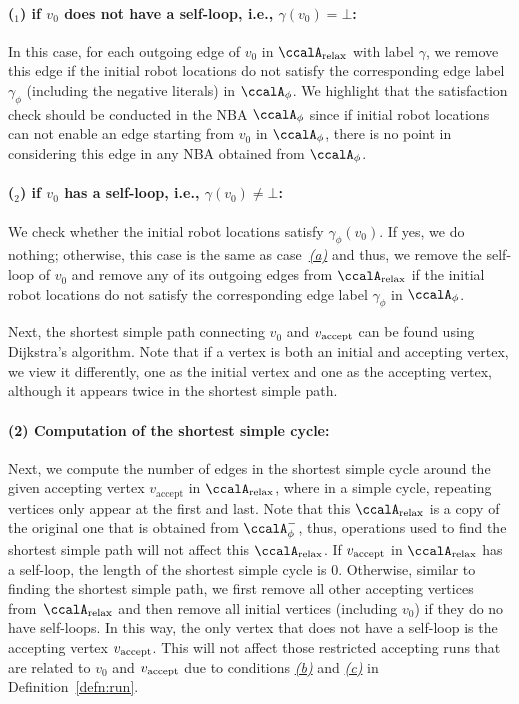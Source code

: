 \documentclass[Afour,sageh,times]{sagej}
\newcounter{mycounter}
\newcommand{\auto}[1]{\ccalA_{\textup{#1}}}
\newcommand{\autop}{\ccalA_{\phi}}
\newcommand{\vertex}[1]{v_{\textup{#1}}}
\begin{document}
{  \paragraph{($_1$) if $v_0$ does not have a self-loop, i.e., $\gamma(v_0)=\bot$:}\label{sec:initial} In this case, for each outgoing edge of $v_0$ in $\auto{relax}$ with label $\gamma$,  we remove this edge  if the initial robot locations do not satisfy the corresponding edge label $\gamma_{\phi}$ (including the negative literals) in $\autop$. We highlight that the satisfaction check should be conducted in the NBA $\autop$ since if initial robot locations can not enable an edge starting from $v_0$ in $\autop$, there is no point in considering this edge in any NBA obtained from $\autop$.
\paragraph{($_2$) if $v_0$ has a self-loop, i.e., $\gamma(v_0)\neq\bot$:} We check whether the initial robot locations satisfy $\gamma_{\phi}(v_0)$. If yes, we do nothing; otherwise, this case is the  same as case~\hyperref[sec:initial]{\it (a)} and thus, we remove the self-loop of $v_0$ and
remove any of its  outgoing edges  from $\auto{relax}$ if the initial robot locations do not satisfy the corresponding edge label $\gamma_{\phi}$ in $\autop$.

Next, the shortest simple path connecting $v_0$ and $\vertex{accept}$ can be found using Dijkstra's algorithm.  Note that if a vertex is both an initial and accepting vertex, we view it differently, one as the initial vertex and one as the accepting vertex, although it appears twice in the shortest simple path.
\paragraph{(2) Computation of the shortest simple cycle:} Next, we compute the number of edges in the shortest simple cycle around the given accepting vertex $v_\text{accept}$ in $\auto{relax}$, where in a simple cycle, repeating vertices only appear at the first and last. Note that this $\auto{relax}$ is a copy of the original one that is obtained from $\autop^-$, thus, operations used to  find the shortest simple  path will not affect this $\auto{relax}$. If $\vertex{accept}$ in $\auto{relax}$ has a self-loop, the length of the shortest simple cycle is 0. Otherwise, similar to finding the shortest simple path, we first remove all other accepting vertices from~$\auto{relax}$ and then remove all initial vertices (including $v_0$) if they do no have self-loops.  In this way, the only vertex that does not have a self-loop is the accepting vertex $\vertex{accept}$.  This will not affect those restricted accepting runs that are related to  $v_0$ and $\vertex{accept}$  due to conditions \hyperref[cond:b]{\it (b)} and \hyperref[cond:c]{\it (c)} in Definition~\ref{defn:run}.


}
\end{document}

